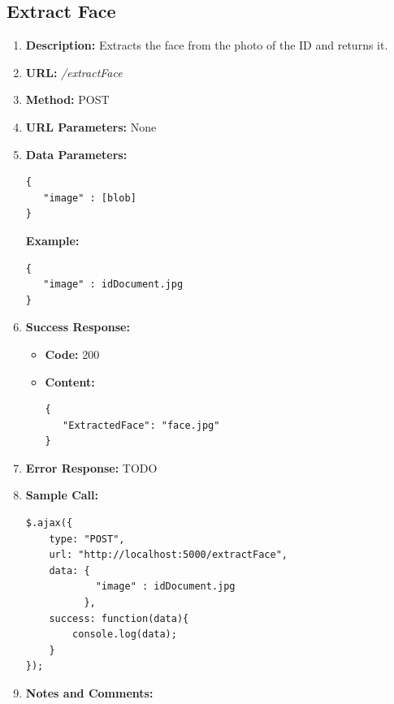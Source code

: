 \documentclass{article}
\begin{document}
\subsection{Extract Face}
\begin{enumerate}
	\item \textbf{Description:} Extracts the face from the photo of the ID and returns it.
	\item \textbf{URL:} \textit{/extractFace}
	\item \textbf{Method:} POST
	\item \textbf{URL Parameters:} None
	\item \textbf{Data Parameters:}

	\begin{lstlisting}
{
   "image" : [blob]
}
	\end{lstlisting}

	\textbf{Example:}

	\begin{lstlisting}
{
   "image" : idDocument.jpg
}
	\end{lstlisting}
	
	\item \textbf{Success Response:} 
		\begin{itemize}
			\item \textbf{Code:} 200
			\item \textbf{Content:}
			\begin{lstlisting}
{
   "ExtractedFace": "face.jpg"
}
			\end{lstlisting}
		\end{itemize}
		\item \textbf{Error Response:} TODO
		\item \textbf{Sample Call:}
		\begin{lstlisting}
$.ajax({
    type: "POST",
    url: "http://localhost:5000/extractFace",
    data: {
            "image" : idDocument.jpg
          },
    success: function(data){
        console.log(data);
    }
});
		\end{lstlisting}
		\item \textbf{Notes and Comments:}
\end{enumerate}
\end{document}
